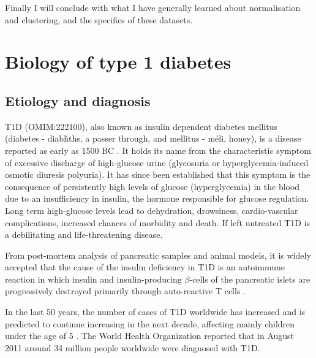 Finally I will conclude with what I have generally learned about normalisation and clustering, and the specifics of these datasets.


\section{Biology of type 1 diabetes}

\subsection{Etiology and diagnosis}

\Gls{T1D} (OMIM:222100), also known as insulin dependent diabetes mellitus (diabetes - \foreignlanguage{greek}{diab\'hths},
a passer through, and mellitus - \foreignlanguage{greek}{m\'eli}, honey), is a disease reported as early as $1500$ BC \citep{Poretsky:2010wr}.
It holds its name from the characteristic symptom of excessive discharge of high-glucose urine (glycosuria or hyperglycemia-induced osmotic diuresis polyuria).
It has since been established that this symptom is the consequence of persistently high levels of glucose (hyperglycemia) in the blood due to an insufficiency in insulin,
the hormone responsible for glucose regulation.
Long term high-glucose levels lead to dehydration, drowsiness, cardio-vascular complications, increased chances of morbidity and death.  
If left untreated T1D is a debilitating and life-threatening disease.

From post-mortem analysis of pancreatic samples and animal models,
it is widely accepted that the cause of the insulin deficiency in \gls{T1D} is an autoimmune reaction
in which insulin and insulin-producing $\beta$-cells of the pancreatic islets
are progressively destroyed primarily through auto-reactive T cells \citep{Todd:2010bl}.  

In the last 50 years, the number of cases of T1D worldwide has increased and is predicted to continue increasing in the next decade,
affecting mainly children under the age of 5 \citep{Patterson:2009gj}.
The World Health Organization reported that in August 2011 around 34 million people worldwide were diagnosed with T1D.


